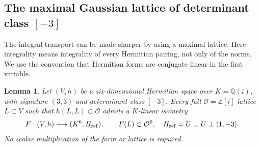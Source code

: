\documentclass[11pt]{article}
\newtheorem{lemma}[theorem]{Lemma}
\theoremstyle{definition}
\theoremstyle{remark}
\begin{document}
\subsection{The maximal Gaussian lattice of determinant class \texorpdfstring{$[-3]$}{[-3]}}

The integral transport can be made sharper by using a maximal lattice.
Here integrality means integrality of every Hermitian pairing, not only
of the norms.  We use the convention that Hermitian forms are conjugate
linear in the first variable.

\begin{lemma}\label{lem:gaussian-maximal-lattice}
Let $(V,h)$ be a six-dimensional Hermitian space over $K=\mathbb Q(i)$,
with signature $(3,3)$ and determinant class $[-3]$.  Every full
$\mathcal O=\mathbb Z[i]$-lattice $L\subset V$ such that
$h(L,L)\subset\mathcal O$ admits a $K$-linear isometry
\[
 F:(V,h)\longrightarrow(K^6,H_{\rm ref}),\qquad
 F(L)\subset\mathcal O^6,
 \quad H_{\rm ref}=U\perp U\perp\langle1,-3\rangle.
\]
No scalar multiplication of the form or lattice is required.
\end{lemma}
\end{document}
